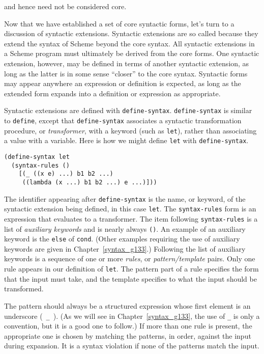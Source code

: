 and hence need not be considered core.


\label{further_s11}Now that we have established
a set of core syntactic forms, let's turn to a discussion of
\label{further_s12}syntactic extensions.
Syntactic extensions are so called because they extend the syntax of Scheme
beyond the core syntax.
All syntactic extensions in a Scheme program must ultimately
be derived from the core forms.
One syntactic extension, however, may be defined
in terms of another syntactic extension, as long as the latter
is in some sense ``closer'' to the core syntax.
Syntactic forms may appear anywhere an expression or definition is
expected, as long as the extended form expands into a definition or
expression as appropriate.


Syntactic extensions are defined with \label{further_s13}\texttt{define-syntax}.
\texttt{define-syntax} is similar to \texttt{define}, except that \texttt{define-syntax} associates
a syntactic transformation procedure, or \label{further_s14}\textit{transformer}, with
a \label{further_s15}keyword (such as \texttt{let}), rather than associating a value with
a variable.
Here is how we might define \texttt{let} with \texttt{define-syntax}.


\begin{alltt}
(define-syntax let
  (syntax-rules ()
    [(\_{} ((x e) ...) b1 b2 ...)
     ((lambda (x ...) b1 b2 ...) e ...)]))
\end{alltt}


The identifier appearing after \texttt{define-syntax} is the name, or keyword,
of the syntactic extension being defined, in this case \texttt{let}.
The \texttt{syntax-rules} form is an expression that evaluates to a
transformer.
The item following \texttt{syntax-rules} is a list of
\label{further_s16}\textit{auxiliary keywords} and is nearly always \texttt{()}.
An example of an auxiliary keyword is the \texttt{else} of \texttt{cond}.
(Other examples requiring the use of auxiliary keywords are given in
Chapter \ref{syntax_g133}.)
Following the list of auxiliary keywords is a sequence of one or more
\textit{rules}, or \textit{pattern/template} pairs.
Only one rule appears in our definition of \texttt{let}.
The pattern part of a rule specifies the form that the input must take,
and the template specifies to what the input should be transformed.


The pattern should always be a structured expression whose first element
is an \label{further_s17}underscore ( \texttt{\_{}} )\label{further_s18}.
(As we will see in Chapter \ref{syntax_g133}, the use of \texttt{\_{}} is only a
convention, but it is a good one to follow.)
If more than one rule is present, the appropriate one
is chosen by matching the patterns, in order, against the input during
expansion.
It is a syntax violation if none of the patterns match the input.


